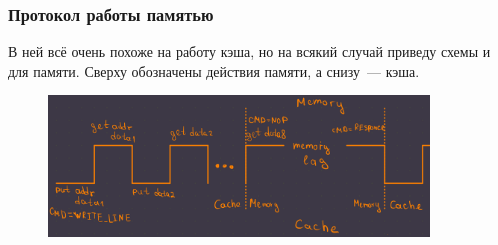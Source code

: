 \documentclass[14pt, russian, onesize]{extreport}
\begin{document}
\subsubsection*{ Протокол работы памятью }
В ней всё очень похоже на работу кэша, но на всякий случай 
приведу схемы и для памяти. Сверху обозначены действия памяти,
а снизу~--- кэша.
\begin{figure}[H]
    \centering
    \includegraphics[width=0.9\textwidth]{memory_write}
    \caption{}
\end{figure}
\end{document}
